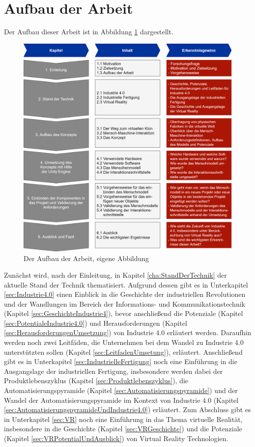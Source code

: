 \section{Aufbau der Arbeit}\label{sec:AufbauDerArbeit}
Der Aufbau dieser Arbeit ist in Abbildung \ref{fig:AufbauDerArbeit} dargestellt.
\begin{figure}[h]
	\centering
	\includegraphics[width=1\linewidth]{Bilder/A55_AufbauNeu}
	\caption{Der Aufbau der Arbeit, eigene Abbildung}
	\label{fig:AufbauDerArbeit}
\end{figure}
\newline\newline
Zunächst wird, nach der Einleitung, in Kapitel \ref{cha:StandDerTechnik} der aktuelle Stand der Technik thematisiert. Aufgrund dessen gibt es in Unterkapitel \ref{sec:Industrie4.0} einen Einblick in die Geschichte der industriellen Revolutionen und der Wandlungen im Bereich der Informations- und Kommunikationstechnik (Kapitel \ref{sec:GeschichteIndustrie4}), bevor anschließend die Potenziale (Kapitel \ref{sec:PotentialeIndustrie4.0}) und Herausforderungen (Kapitel \ref{sec:HerausforderungenUmsetzung}) von Industrie 4.0 erläutert werden. Daraufhin werden noch zwei Leitfäden, die Unternehmen bei dem Wandel zu Industrie 4.0 unterstützten sollen (Kapitel \ref{sec:LeitfadenUmsetung}), erläutert. Anschließend gibt es in Unterkapitel \ref{sec:IndustrielleFertigung} noch eine Einführung in die Ausgangslage der industriellen Fertigung, insbesondere werden dabei der Produktlebenszyklus (Kapitel \ref{sec:Produktlebenszyklus}), die Automatisierungspyramide (Kapitel \ref{sec:Automatisierungspyramide}) und der Wandel der Automatisierungspyramide im Kontext von Industrie 4.0 (Kapitel \ref{sec:AutomatisierungspyramideUndIndustrie4.0}) erläutert. Zum Abschluss gibt es in Unterkapitel \ref{sec:VR} noch eine Einführung in das Thema virtuelle Realität, insbesondere in die Geschichte (Kapitel \ref{sec:VRGeschichte}) und die Potenziale (Kapitel \ref{sec:VRPotentialUndAusblick}) von Virtual Reality Technologien.
